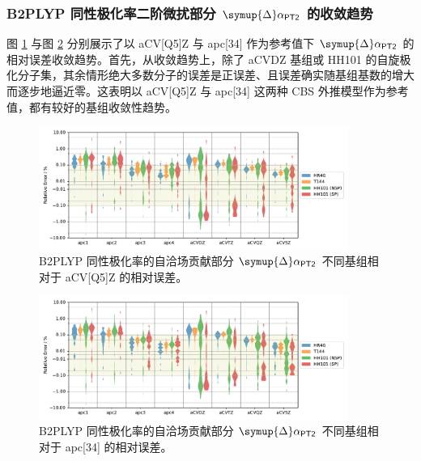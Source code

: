 \subsubsection{B2PLYP 同性极化率二阶微扰部分 $\symup{\Delta} \alpha_\textsf{PT2}$ 的收敛趋势}

图 \ref{fig.6.converg-b2p-pt2-aCV5Z} 与图 \ref{fig.6.converg-b2p-pt2-apc4} 分别展示了以 aCV[Q5]Z 与 apc[34] 作为参考值下 $\symup{\Delta} \alpha_\textsf{PT2}$ 的相对误差收敛趋势。首先，从收敛趋势上，除了 aCVDZ 基组或 HH101 的自旋极化分子集，其余情形绝大多数分子的误差是正误差、且误差确实随基组基数的增大而逐步地逼近零。这表明以 aCV[Q5]Z 与 apc[34] 这两种 CBS 外推模型作为参考值，都有较好的基组收敛性趋势。

\begin{figure}[!ht]
    \centering
    \includegraphics[width=0.9\textwidth]{assets/converg-b2p-pt2-aCV5Z.pdf}
    \caption{B2PLYP 同性极化率的自洽场贡献部分 $\symup{\Delta} \alpha_\textsf{PT2}$ 不同基组相对于 aCV[Q5]Z 的相对误差。}
    \label{fig.6.converg-b2p-pt2-aCV5Z}
\end{figure}

\begin{figure}[!ht]
    \centering
    \includegraphics[width=0.9\textwidth]{assets/converg-b2p-pt2-apc4.pdf}
    \caption{B2PLYP 同性极化率的自洽场贡献部分 $\symup{\Delta} \alpha_\textsf{PT2}$ 不同基组相对于 apc[34] 的相对误差。}
    \label{fig.6.converg-b2p-pt2-apc4}
\end{figure}

